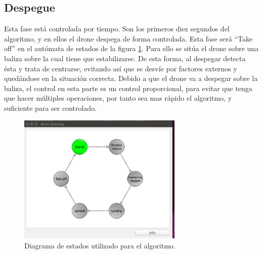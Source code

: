\subsection{Despegue}

\hspace{1 cm} Esta fase est\'a controlada por tiempo. Son los primeros diez segundos del algoritmo, y en ellos el drone despega de forma controlada. Esta fase ser\'a "`Take off"' en el aut\'omata de estados de la figura \ref{fig:Diag_estados2}. Para ello se sit\'ua el drone sobre una baliza sobre la cual tiene que estabilizarse. De esta forma, al despegar detecta \'esta y trata de centrarse, evitando as\'i que se desv\'ie por factores externos y qued\'andose en la situaci\'on correcta. Debido a que el drone va a despegar sobre la baliza, el control en esta parte es un control proporcional, para evitar que tenga que hacer m\'ultiples operaciones, por tanto sea mas r\'apido el algoritmo, y suficiente para ser controlado.


\begin{figure}[ht]
	\centering
		\includegraphics[width=0.7\textwidth]{imgs/states.png}
        \caption{Diagrama de estados utilizado para el algoritmo.}
	\label{fig:Diag_estados2}
\end{figure}


